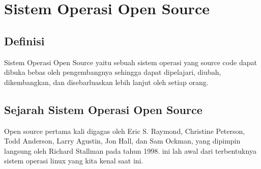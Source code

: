 \section{Sistem Operasi Open Source}
\subsection{Definisi}
	Sistem Operasi Open Source yaitu sebuah sistem operasi yang source code dapat dibuka bebas oleh pengembangnya sehingga dapat dipelajari, diubah, dikembangkan, dan disebarluaskan lebih lanjut oleh setiap orang.

\subsection{Sejarah Sistem Operasi Open Source}
	Open source pertama kali digagas oleh  Eric S. Raymond, Christine Peterson, Todd Anderson, Larry Agustin, Jon Hall, dan Sam Ockman, yang dipimpin langsung oleh Richard Stallman pada tahun 1998. ini lah awal dari terbentuknya sistem operasi linux yang kita kenal saat ini.